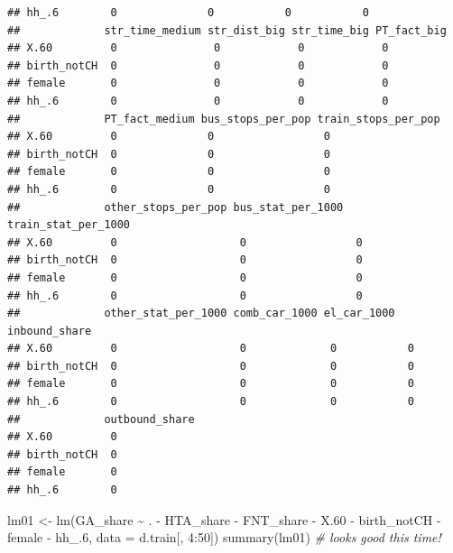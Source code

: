 \documentclass[
]{article}
\newenvironment{Shaded}{\begin{snugshade}}{\end{snugshade}}
\newcommand{\AttributeTok}[1]{\textcolor[rgb]{0.77,0.63,0.00}{#1}}
\newcommand{\CommentTok}[1]{\textcolor[rgb]{0.56,0.35,0.01}{\textit{#1}}}
\newcommand{\DecValTok}[1]{\textcolor[rgb]{0.00,0.00,0.81}{#1}}
\newcommand{\FloatTok}[1]{\textcolor[rgb]{0.00,0.00,0.81}{#1}}
\newcommand{\FunctionTok}[1]{\textcolor[rgb]{0.00,0.00,0.00}{#1}}
\newcommand{\NormalTok}[1]{#1}
\newcommand{\OtherTok}[1]{\textcolor[rgb]{0.56,0.35,0.01}{#1}}
\newcommand{\SpecialCharTok}[1]{\textcolor[rgb]{0.00,0.00,0.00}{#1}}
\begin{document}
\begin{verbatim}
## hh_.6        0              0           0           0             
##             str_time_medium str_dist_big str_time_big PT_fact_big
## X.60         0               0            0            0         
## birth_notCH  0               0            0            0         
## female       0               0            0            0         
## hh_.6        0               0            0            0         
##             PT_fact_medium bus_stops_per_pop train_stops_per_pop
## X.60         0              0                 0                 
## birth_notCH  0              0                 0                 
## female       0              0                 0                 
## hh_.6        0              0                 0                 
##             other_stops_per_pop bus_stat_per_1000 train_stat_per_1000
## X.60         0                   0                 0                 
## birth_notCH  0                   0                 0                 
## female       0                   0                 0                 
## hh_.6        0                   0                 0                 
##             other_stat_per_1000 comb_car_1000 el_car_1000 inbound_share
## X.60         0                   0             0           0           
## birth_notCH  0                   0             0           0           
## female       0                   0             0           0           
## hh_.6        0                   0             0           0           
##             outbound_share
## X.60         0            
## birth_notCH  0            
## female       0            
## hh_.6        0
\end{verbatim}

\begin{Shaded}
\begin{Highlighting}[]
\NormalTok{lm01 }\OtherTok{\textless{}{-}} \FunctionTok{lm}\NormalTok{(GA\_share }\SpecialCharTok{\textasciitilde{}}\NormalTok{ . }\SpecialCharTok{{-}}\NormalTok{ HTA\_share }\SpecialCharTok{{-}}\NormalTok{ FNT\_share }\SpecialCharTok{{-}} 
\NormalTok{                   X}\FloatTok{.60} \SpecialCharTok{{-}}\NormalTok{ birth\_notCH }\SpecialCharTok{{-}}\NormalTok{ female }\SpecialCharTok{{-}}\NormalTok{ hh\_}\FloatTok{.6}\NormalTok{, }\AttributeTok{data =}\NormalTok{ d.train[, }\DecValTok{4}\SpecialCharTok{:}\DecValTok{50}\NormalTok{])}
\FunctionTok{summary}\NormalTok{(lm01) }\CommentTok{\# looks good this time!}
\end{Highlighting}
\end{Shaded}
\end{document}
